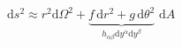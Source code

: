 \documentclass{article}
\begin{document}
$\mathrm{d}s^2\approx r^2\mathrm{d}\Omega^2+\underbrace{f\,\mathrm{d}r^2+g\,\mathrm{d}\theta^2}_{h_{\alpha\beta}\mathrm{d}y^\alpha\mathrm{d}y^\beta}$
$\mathrm{d}A$
\end{document}
